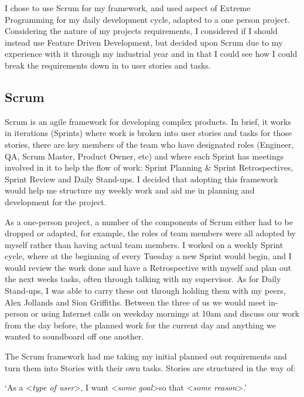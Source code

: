 I chose to use Scrum for my framework, and used aspect of Extreme Programming for my daily development cycle, adapted to a one person project. Considering the  nature of my projects requirements, I considered if I should instead use Feature Driven Development, but decided upon Scrum due to my experience with it through my industrial year and in that I could see how I could break the requirements down in to user stories and tasks.

\subsection{Scrum}
Scrum is an agile framework for developing complex products\cite{Schw01a}. In brief, it works in iterations (Sprints) where work is broken into user stories and tasks for those stories, there are key members of the team who have designated roles (Engineer, QA, Scrum Master, Product Owner, etc) and where each Sprint has meetings involved in it to help the flow of work: Sprint Planning \& Sprint Retrospectives, Sprint Review and Daily Stand-ups. I decided that adopting this framework would help me structure my weekly work and aid me in planning and development for the project.

As a one-person project, a number of the components of Scrum either had to be dropped or adapted, for example, the roles of team members were all adopted by myself rather than having actual team members. I worked on a weekly Sprint cycle, where at the beginning of every Tuesday a new Sprint would begin, and I would review the work done and have a Retrospective with myself and plan out the next weeks tasks, often through talking with my supervisor. As for Daily Stand-ups, I was able to carry these out through holding them with my peers, Alex Jollands and Sion Griffiths. Between the three of us we would meet in-person or using Internet calls on weekday mornings at 10am and discuss our work from the day before, the planned work for the current day and anything we wanted to soundboard off one another.

The Scrum framework had me taking my initial planned out requirements and turn them into Stories with their own tasks. Stories are structured in the way of:
\newline

`As a \textless \textit{type of user}\textgreater, I want \textless \textit{some goal}\textgreater so that \textless \textit{some reason}\textgreater.'\cite{userstories}
\newline

